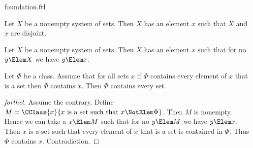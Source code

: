 \documentclass{stex}
\begin{document}
\begin{smodule}{foundation.ftl}

\begin{axiom}[forthel,title=Foundation,id=FOUNDATIONS_10_1320008569323520]
  Let $X$ be a nonempty system of sets.
  Then $X$ has an element $x$ such that $X$ and $x$ are disjoint.
\end{axiom}

\begin{corollary}[forthel,id=FOUNDATIONS_10_9532145874510315]
  Let $X$ be a nonempty system of sets.
  Then $X$ has an element $x$ such that for no $y \Elem X$ we have $y \Elem x$.
\end{corollary}

\begin{proposition}[forthel,id=FOUNDATIONS_11_2812087589928960]
  Let $\Phi$ be a class.
  Assume that for all sets $x$ if $\Phi$ contains every element of $x$ that is a set then $\Phi$ contains $x$.
  Then $\Phi$ contains every set.
\end{proposition}
\begin{proof}[forthel]
  Assume the contrary.
  Define $M = \CClass{x}{x\text{ is a set such that }x \NotElem \Phi}$.
  Then $M$ is nonempty.
  Hence we can take a $x \Elem M$ such that for no $y \Elem M$ we have $y \Elem x$.
  Then $x$ is a set such that every element of $x$ that is a set is contained in $\Phi$.
  Thus $\Phi$ contains $x$.
  Contradiction.
\end{proof}
\end{smodule}
\end{document}
